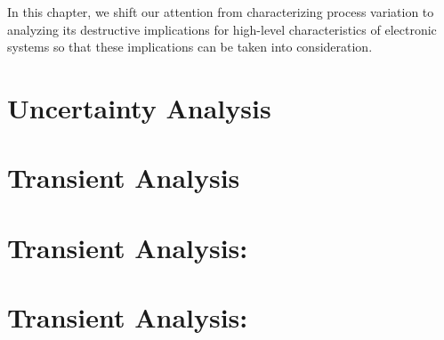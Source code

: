 In this chapter, we shift our attention from characterizing process variation to
analyzing its destructive implications for high-level characteristics of
electronic systems so that these implications can be taken into consideration.

\section{\introductiontitle}

\section{\motivationtitle}

\section{\problemtitle}

\section{\pasttitle}

\section{\solutiontitle}

\section{Uncertainty Analysis}

\section{Transient Analysis}

\section{Transient Analysis: \applicationtitle}

\section{Transient Analysis: \resultstitle}

